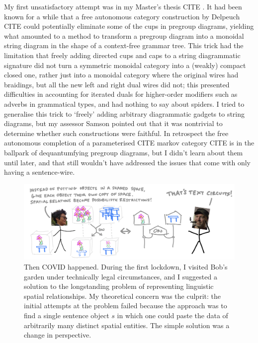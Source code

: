 My first unsatisfactory attempt was in my Master's thesis \bR CITE \e. It had been known for a while that a free autonomous category construction by Delpeuch \bR CITE \e could potentially eliminate some of the cups in pregroup diagrams, yielding what amounted to a method to transform a pregroup diagram into a monoidal string diagram in the shape of a context-free grammar tree. This trick had the limitation that freely adding directed cups and caps to a string diagrammatic signature did not turn a symmetric monoidal category into a (weakly) compact closed one, rather just into a monoidal category where the original wires had braidings, but all the new left and right dual wires did not; this presented difficulties in accounting for iterated duals for higher-order modifiers such as adverbs in grammatical types, and had nothing to say about spiders. I tried to generalise this trick to `freely' adding arbitrary diagrammatic gadgets to string diagrams, but my assessor Samson pointed out that it was nontrivial to determine whether such constructions were faithful. In retrospect the free autonomous completion of a parameterised \bR CITE \e markov category \bR CITE \e is in the ballpark of dequantumfying pregroup diagrams, but I didn't learn about them until later, and that still wouldn't have addressed the issues that come with only having a sentence-wire.

\begin{figure}[h!]
\includegraphics{figures/cartoons/circify1}
\caption{Then COVID happened. During the first lockdown, I visited Bob's garden under technically legal circumstances, and I suggested a solution to the longstanding problem of representing linguistic spatial relationships. My theoretical concern was the culprit: the initial attempts at the problem failed because the approach was to find a single sentence object $s$ in which one could paste the data of arbitrarily many distinct spatial entities. The simple solution was a change in perspective.}
\end{figure}

